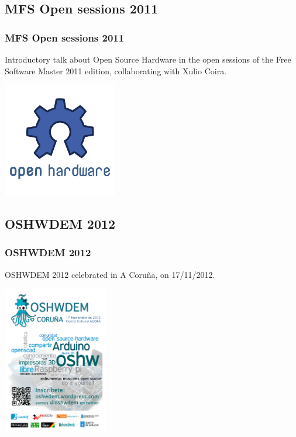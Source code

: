 \documentclass[slidestop,compress,mathserif]{beamer}
\begin{document}
\subsection{MFS Open sessions 2011}
\begin{frame}
\frametitle{MFS Open sessions 2011}
Introductory talk about Open Source Hardware in the open sessions of the Free Software Master 2011 edition, collaborating with Xulio Coira.

\begin{center}
\includegraphics[height=5cm]{images/ohw-logo.png}
\end{center}

\end{frame}

\subsection{OSHWDEM 2012}
\begin{frame}
\frametitle{OSHWDEM 2012}
OSHWDEM 2012 celebrated in A Coru\~na, on 17/11/2012.

\begin{center}
\includegraphics[height=6.5cm]{images/cartel-oshwdem5-300.png}
\end{center}

\end{frame}
\end{document}
